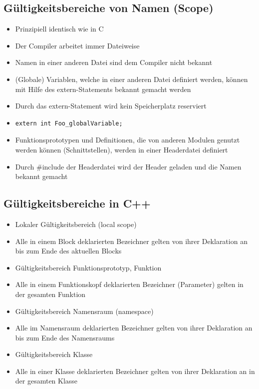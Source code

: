 \subsection{Gültigkeitsbereiche von Namen (Scope)}
\label{sec:Gueltigkeitsbereiche von Namen (Scope)}
\begin{itemize}
	\item Prinzipiell identisch wie in C
	\item Der Compiler arbeitet immer Dateiweise
	\item Namen in einer anderen Datei sind dem Compiler nicht bekannt
	\item (Globale) Variablen, welche in einer anderen Datei definiert werden, können mit Hilfe des extern-Statements bekannt gemacht werden
	\item Durch das extern-Statement wird kein Speicherplatz reserviert
	\item[\-]
	\noindent
\begin{minipage}{\linewidth}
\begin{lstlisting}
extern int Foo_globalVariable;
\end{lstlisting}
\end{minipage}
	\item Funktionsprototypen und Definitionen, die von anderen Modulen genutzt werden können (Schnittstellen), werden in einer Headerdatei definiert
	\item Durch \#include der Headerdatei wird der Header geladen und die Namen bekannt gemacht
\end{itemize}

\subsection{Gültigkeitsbereiche in C++}
\label{sec:Gueltigkeitsbereiche in C++}
\begin{itemize}
	\item Lokaler Gültigkeitsbereich (local scope)
	\item[\-] Alle in einem Block deklarierten Bezeichner gelten von ihrer Deklaration an bis zum Ende des aktuellen Blocks
	\item Gültigkeitsbereich Funktionsprototyp, Funktion
	\item[\-] Alle in einem Funktionskopf deklarierten Bezeichner (Parameter) gelten in der gesamten Funktion
	\item Gültigkeitsbereich Namensraum (namespace)
	\item[\-] Alle im Namensraum deklarierten Bezeichner gelten von ihrer Deklaration an bis zum Ende des Namensraums
	\item Gültigkeitsbereich Klasse
	\item[\-] Alle in einer Klasse deklarierten Bezeichner gelten von ihrer Deklaration an in der gesamten Klasse
\end{itemize}

